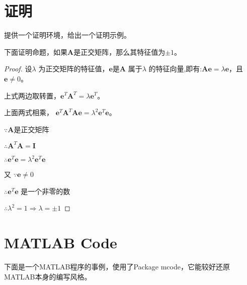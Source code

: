 

\lstset{language=Matlab}

\appendix
\begin{appendix}
\chapter{证明}
\begin{spacing}{1.5}
提供一个证明环境，给出一个证明示例。

下面证明命题，如果$\bm{A}$是正交矩阵，那么其特征值为$\pm1$。
\begin{proof}
设$\lambda$ 为正交矩阵的特征值，$\bm{e}$是$\bm{A}$ 属于$\lambda$ 的特征向量,即有:$\bm{A}\bm{e}=\lambda\bm{e}$，且$\bm{e}\neq0$。

上式两边取转置，$\bm{e}^{T}\bm{A}^{T}=\lambda\bm{e}^{T}$。

上面两式相乘， $\bm{e}^{T}\bm{A}^{T}\bm{A}\bm{e}=\lambda^2\bm{e}^{T}\bm{e}$。

$\because\bm{A}$是正交矩阵

$\therefore\bm{A}^{T}\bm{A}=\bm{I}$

$\therefore\bm{e}^{T}\bm{e}=\lambda^2\bm{e}^{T}\bm{e}$

又 $\because\bm{e}\neq0$

$\therefore\bm{e}^{T}\bm{e}$ 是一个非零的数

$\therefore\lambda^2=1\Rightarrow\lambda=\pm1$
\end{proof}



\end{spacing}


\chapter{MATLAB Code}
\begin{spacing}{1.5}
下面是一个MATLAB程序的事例，使用了Package mcode，它能较好还原MATLAB本身的编写风格。


\end{spacing}
\end{appendix}

